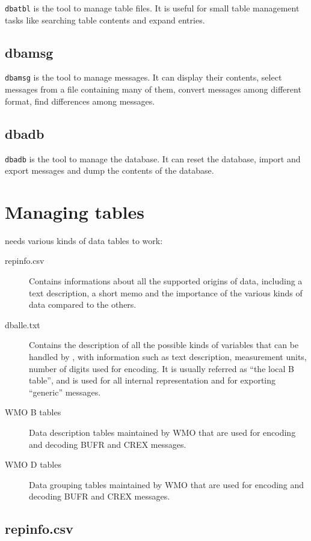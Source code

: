 {\tt dbatbl} is the tool to manage table files.  It is useful for small
table management tasks like searching table contents and expand entries.

\subsection{dbamsg}

{\tt dbamsg} is the tool to manage messages.  It can display their contents,
select messages from a file containing many of them, convert messages among
different format, find differences among messages.

\subsection{dbadb}

{\tt dbadb} is the tool to manage the \dballe{} database.  It can reset the
database, import and export messages and dump the contents of the database.

\section {Managing tables}

\dballe{} needs various kinds of data tables to work:

\begin{description}
\item[repinfo.csv]
  Contains informations about all the supported origins of data, including a
  text description, a short memo and the importance of the various kinds of
  data compared to the others.
\item[dballe.txt]
  Contains the description of all the possible kinds of variables that can be
  handled by \dballe{}, with information such as text description, measurement
  units, number of digits used for encoding.  It is usually referred as ``the
  local B table'', and is used for all internal representation and for
  exporting ``generic'' messages.
\item[WMO B tables]
  Data description tables maintained by WMO that are used for encoding and
  decoding BUFR and CREX messages.
\item[WMO D tables]
  Data grouping tables maintained by WMO that are used for encoding and
  decoding BUFR and CREX messages.
\end{description}

\subsection{repinfo.csv}

